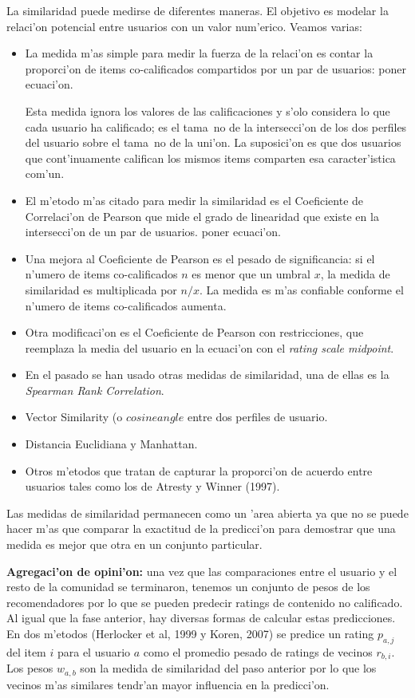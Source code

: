 \documentclass[11pt]{article}
\begin{document}
La similaridad puede medirse de diferentes maneras. El objetivo es modelar la relaci'on potencial entre usuarios con un valor num'erico.  Veamos varias:

\begin{itemize}
\item La medida m'as simple para medir la fuerza de la relaci'on es contar la proporci'on de items co-calificados compartidos por un par de usuarios: poner ecuaci'on.

Esta medida ignora los valores de las calificaciones y s'olo considera lo que cada usuario ha calificado; es el tama~no de la intersecci'on de los dos perfiles del usuario sobre el tama~no de la uni'on. La suposici'on es que dos usuarios que cont'inuamente califican los mismos items comparten esa caracter'istica com'un.
\item El m'etodo m'as citado para medir la similaridad es el Coeficiente de Correlaci'on de Pearson que mide el grado de linearidad que existe en la intersecci'on de un par de usuarios. poner ecuaci'on.
\item Una mejora al Coeficiente de Pearson es el pesado de significancia: si el n'umero de items co-calificados $n$ es menor que un umbral $x$, la medida de similaridad es multiplicada por $n/x$. La medida es m'as confiable conforme el n'umero de items co-calificados aumenta.
\item Otra modificaci'on es el Coeficiente de Pearson con restricciones, que reemplaza la media del usuario en la ecuaci'on con el \textit{rating scale midpoint}.
\item En el pasado se han usado otras medidas de similaridad, una de ellas es la \textit{Spearman Rank Correlation}.
\item Vector Similarity (o $cosine angle$ entre dos perfiles de usuario.
\item Distancia Euclidiana y Manhattan.
\item Otros m'etodos que tratan de capturar la proporci'on de acuerdo entre usuarios tales como los de Atresty y Winner (1997).
\end{itemize}

Las medidas de similaridad permanecen como un 'area abierta ya que no se puede hacer m'as que comparar la exactitud de la predicci'on para demostrar que una medida es mejor que otra en un conjunto particular.

\smallskip
\textbf{Agregaci'on de opini'on:} una vez que las comparaciones entre el usuario y el resto de la comunidad se terminaron, tenemos un conjunto de pesos de los recomendadores por lo que se pueden predecir ratings de contenido no calificado. Al igual que la fase anterior, hay diversas formas de calcular estas predicciones. En dos m'etodos (Herlocker et al, 1999 y Koren, 2007) se predice un rating $p_{a,j}$ del item $i$ para el usuario $a$ como el promedio pesado de ratings de vecinos $r_{b,i}$. Los pesos $w_{a,b}$ son la medida de similaridad del paso anterior por lo que los vecinos m'as similares tendr'an mayor influencia en la predicci'on.
\end{document}
